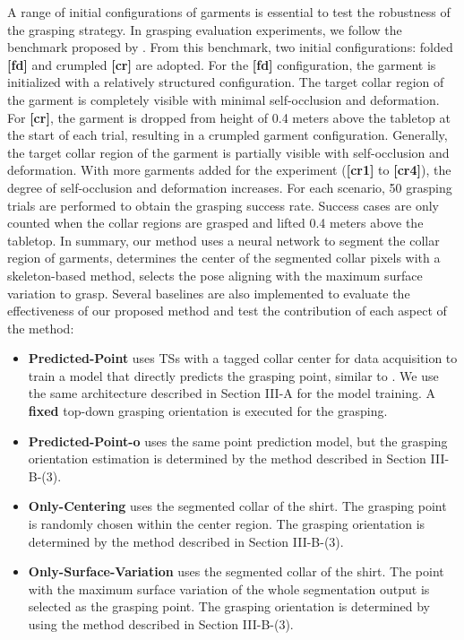 \documentclass[letterpaper, 10 pt, conference]{ieeeconf}  %
\begin{document}
A range of initial configurations of garments is essential to test the robustness of the grasping strategy. In grasping evaluation experiments, we follow the benchmark proposed by \cite{garcia2020benchmarking}. From this benchmark, two initial configurations: folded \textbf{[fd]} and crumpled \textbf{[cr]} are adopted. 
For the \textbf{[fd]} configuration, the garment is initialized with a relatively structured configuration. The target collar region of the garment is completely visible with minimal self-occlusion and deformation.
For \textbf{[cr]}, the garment is dropped from height of 0.4 meters above the tabletop at the start of each trial, resulting in a crumpled garment configuration. Generally, the target collar region of the garment is partially visible with self-occlusion and deformation. With more garments added for the experiment (\textbf{[cr1]} to \textbf{[cr4]}), the degree of self-occlusion and deformation increases.
For each scenario, 50 grasping trials are performed to obtain the grasping success rate. Success cases are only counted when the collar regions are grasped and lifted 0.4 meters above the tabletop.
In summary, our method uses a neural network to segment the collar region of garments, determines the center of the segmented collar pixels with a skeleton-based method, selects the pose aligning with the maximum surface variation to grasp. Several baselines are also implemented to evaluate the effectiveness of our proposed method and test the contribution of each aspect of the method:
\begin{itemize}
    \item
    \textbf{Predicted-Point} uses TSs with a tagged collar center for data acquisition to train a model that directly predicts the grasping point, similar to \cite{ramisa2012using, zhang2020learning}. We use the same architecture described in Section III-A for the model training. A \textbf{fixed} top-down grasping orientation is executed for the grasping.
    \item
    \textbf{Predicted-Point-o} uses the same point prediction model, but the grasping orientation estimation is determined by the method described in Section III-B-(3).
    \item
    \textbf{Only-Centering} uses the segmented collar of the shirt. The grasping point is randomly chosen within the center region. The grasping orientation is determined by the method described in Section III-B-(3).
    \item
    \textbf{Only-Surface-Variation} uses the segmented collar of the shirt. The point with the maximum surface variation of the whole segmentation output is selected as the grasping point. The grasping orientation is determined by using the method described in Section III-B-(3).
\end{itemize}
\end{document}
